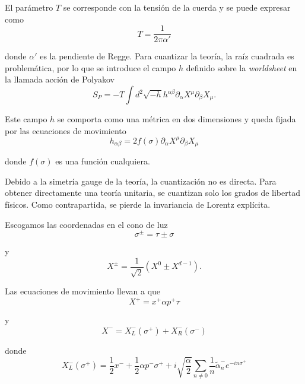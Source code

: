 El parámetro $T$ se corresponde con la tensión de la cuerda y se puede expresar como
\begin{equation}
  T=\frac{1}{2\pi\alpha'}
\end{equation}

donde $\alpha'$ es la pendiente de Regge.
Para cuantizar la teoría, la raíz cuadrada es problemática, por lo que se introduce
el campo $h$ definido sobre la \emph{worldsheet} en la llamada acción de Polyakov
\begin{equation}
  S_P=-T\int d^2  \sqrt{-h}h^{\alpha\beta}\partial_\alpha X^\mu \partial_\beta X_\mu.
\end{equation}

Este campo $h$ se comporta como una métrica en dos dimensiones y queda fijada por las
ecuaciones de movimiento
\begin{equation}
  h_{\alpha\beta}=2f(\sigma)\partial_\alpha X^\mu \partial_\beta X_\mu
\end{equation}

donde $f(\sigma)$ es una función cualquiera.


Debido a la simetría gauge de la teoría, la cuantización no es directa.
Para obtener directamente una teoría unitaria, se cuantizan solo los grados de libertad 
físicos. Como contrapartida, se pierde la invariancia de Lorentz explícita.

Escogamos las coordenadas en el cono de luz
\begin{equation}
  \sigma^\pm=\tau\pm\sigma
\end{equation}

y
\begin{equation}
  X^\pm=\frac{1}{\sqrt 2} (X^0 \pm X^{d-1}).
\end{equation}

Las ecuaciones de movimiento llevan a que 
\begin{equation}
  X^+=x^+\alpha p^+ \tau
\end{equation}

y
\begin{equation}
  X^-=X^-_L(\sigma^+)+X^-_R(\sigma^-)
\end{equation}

donde 
\begin{equation}
  X^-_L(\sigma^+)=\frac 1 2 x^- + \frac 1 2 \alpha p^- \sigma^+ + i\sqrt{\frac \alpha 2}
  \sum_{n\neq0} \frac 1 n \tilde{\alpha}^-_n e^{-in\sigma^+}
\end{equation}

